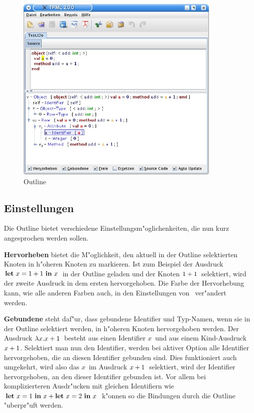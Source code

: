 \begin{figure}[h]
\begin{center}
\includegraphics[width=10cm]{images/outline.png}
\caption{Outline}
\end{center}
\end{figure}

\subsection {Einstellungen}
Die Outline bietet verschiedene Einstellungsm"oglichenkeiten, die nun
kurz angesprochen werden sollen.

{\bf Hervorheben} bietet die M"oglichkeit, den aktuell in der Outline
selektierten Knoten in h"oheren Knoten zu markieren. Ist zum Beispiel
der Ausdruck \glqq$\bli{x}{\infix{+}{1}{1}}{x}$\grqq\ in der Outline geladen
und der Knoten \glqq${\infix{+}{1}{1}}$\grqq\ selektiert, wird der zweite Ausdruck
in dem ersten hervorgehoben. Die Farbe der Hervorhebung kann, wie alle
anderen Farben auch, in den Einstellungen von \TPML\ ver"andert werden.

{\bf Gebundene} steht daf"ur, dass gebundene Identifier und Typ-Namen,
wenn sie in der Outline selektiert werden, in h"oheren Knoten 
hervorgehoben werden. Der Ausdruck \glqq$\abstr{x}{\infix{+}{x}{1}}$\grqq\ besteht
aus einen Identifier \glqq$x$\grqq\ und aus einem Kind-Ausdruck
\glqq$\infix{+}{x}{1}$\grqq. Selektiert man nun den Identifier, werden bei
aktiver Option alle Identifier hervorgehoben, die an diesen Identifier
gebunden sind. Dies funktioniert auch umgekehrt, wird also das
\glqq$x$\grqq\ im Ausdruck \glqq$\infix{+}{x}{1}$\grqq\ selektiert, wird der
Identifier hervorgehoben, an den dieser Identifier gebunden ist. Vor allem
bei komplizierteren Ausdr"ucken mit gleichen Identifiern wie 
\glqq$\bli{x}{1}{\infix{+}{x}{\bli{x}{2}{x}}}$\grqq\ k"onnen so die Bindungen
durch die Outline "uberpr"uft werden.

